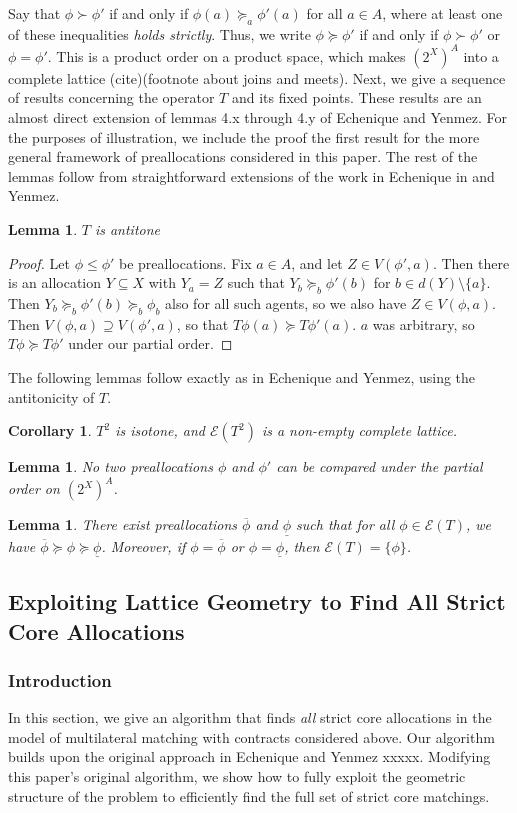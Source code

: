 \documentclass[11pt,reqno]{amsart}
\newtheorem{lemma}[thm]{Lemma}
\newtheorem{cor}[thm]{Corollary}
\theoremstyle{definition}
\numberwithin{equation}{section}
\newcommand{\prf}{\begin{proof}}
\newcommand{\eprf}{\end{proof}}
\newcommand{\ol}{\overline}
\newcommand{\ul}{\underline}
\newcommand{\pre}{\phi}
\newcommand{\prealloc}{(2^X)^A}
\newcommand{\sub}{\subseteq}
\newcommand{\fix}{\mathcal{E}}
\newcommand{\suq}{\succeq}
\newcommand{\su}{\succ}
\begin{document}
Say that $\pre \su \pre'$ if and only if $\pre(a) \suq_a \pre'(a)$ for all $a \in A$, where at least one of these inequalities \emph{holds strictly}. 
Thus, we write $\pre \suq \pre'$ if and only if $\pre \su \pre'$ or $\pre = \pre'$. 
This is a product order on a product space, which makes $\prealloc$ into a complete lattice (cite)(footnote about joins and meets). 
Next, we give a sequence of results concerning the operator $T$ and its fixed points. 
These results are an almost direct extension of lemmas 4.x through 4.y of Echenique and Yenmez.
For the purposes of illustration, we include the proof the first result for the more general framework of preallocations considered in this paper.
The rest of the lemmas follow from straightforward extensions of the work in Echenique in and Yenmez. 
\begin{lemma} \label{lemma:antitone}
$T$ is antitone 
\end{lemma}
\prf
Let $\pre \leq \pre'$ be preallocations.
Fix $a \in A$, and let $Z \in V(\pre',a)$.
Then there is an allocation $Y \sub X$ with $Y_a = Z$ such that $Y_b \suq_b \pre'(b)$ for $b \in d(Y) \setminus \{a\}$.
Then $Y_b \suq_b \pre'(b) \suq_b \pre_b$ also for all such agents, so we also have $Z \in V(\pre,a)$.
Then $V(\pre,a) \supseteq V(\pre',a)$, so that $T\pre(a) \suq T\pre'(a)$. $a$ was arbitrary, so $T\pre \suq T\pre'$ under our partial order. 
\eprf
The following lemmas follow exactly as in Echenique and Yenmez, using the antitonicity of $T$. 
\begin{cor} $T^2$ is isotone, and $\fix(T^2)$ is a non-empty complete lattice. 
\end{cor}
\begin{lemma} \label{lemma:order}
No two preallocations $\pre$ and $\pre'$ can be compared under the partial order on $\prealloc$.
\end{lemma}
\begin{lemma} \label{lemma:top}
There exist preallocations $\ol{\pre}$ and $\ul{\pre}$ such that for all $\pre \in \fix(T)$, we have $\ol{\pre} \suq \pre \suq \ul{\pre}$. Moreover, if $\pre = \ol{\pre}$ or $\pre = \ul{\pre}$, then $\fix(T) = \{\pre\}$. 
\end{lemma}

\subsection{Exploiting Lattice Geometry to Find All Strict Core Allocations}
\subsubsection{Introduction}
In this section, we give an algorithm that finds \emph{all} strict core allocations in the model of multilateral matching with contracts considered above.
Our algorithm builds upon the original approach in Echenique and Yenmez xxxxx.
Modifying this paper's original algorithm, we show how to fully exploit the geometric structure of the problem to efficiently find the full set of strict core matchings. 
\end{document}
